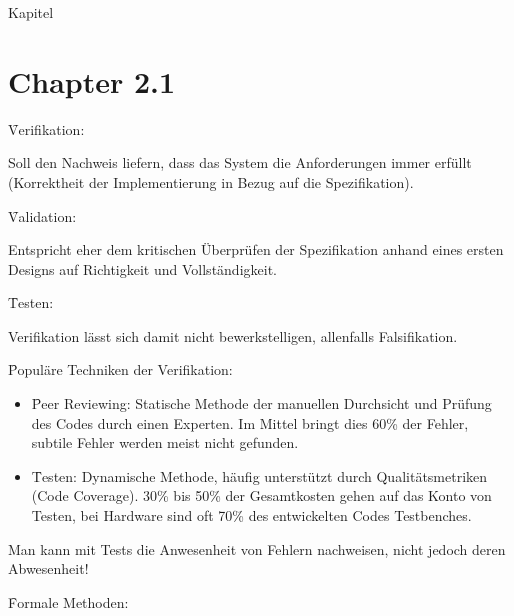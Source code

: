 \begin{chapter}{Kapitel}
 \section*{Chapter 2.1}
 
 \f{Verifikation}: 
 \vspace*{3pt}
 
 \noindent Soll den Nachweis liefern, dass das System die Anforderungen immer erfüllt (Korrektheit der Implementierung in Bezug auf die Spezifikation).
 \vspace*{3pt}
 
 \f{Validation}: 
 \vspace*{3pt}
 
 \noindent Entspricht eher dem kritischen Überprüfen der Spezifikation anhand eines ersten Designs auf Richtigkeit und Vollständigkeit.
 
 \f{Testen}: 
 \vspace*{3pt}
 
 \noindent Verifikation lässt sich damit nicht bewerkstelligen, allenfalls Falsifikation. 
 \vspace*{8pt}
 
 \f{Populäre Techniken der Verifikation}:
\begin{itemize}
 \item \f{Peer Reviewing}: Statische Methode der manuellen Durchsicht und Prüfung des Codes durch einen Experten. Im Mittel bringt dies 60\% der Fehler, subtile
 Fehler werden meist nicht gefunden.
 \item \f{Testen}: Dynamische Methode, häufig unterstützt durch Qualitätsmetriken (Code Coverage). 30\% bis 50\% der Gesamtkosten gehen auf das Konto von Testen, 
 bei Hardware sind oft 70\% des entwickelten Codes Testbenches.
\end{itemize}
Man kann mit Tests die Anwesenheit von Fehlern nachweisen, nicht jedoch deren Abwesenheit!
\vspace*{8pt}

\f{Formale Methoden}:
\vspace*{4pt}


\end{chapter}
